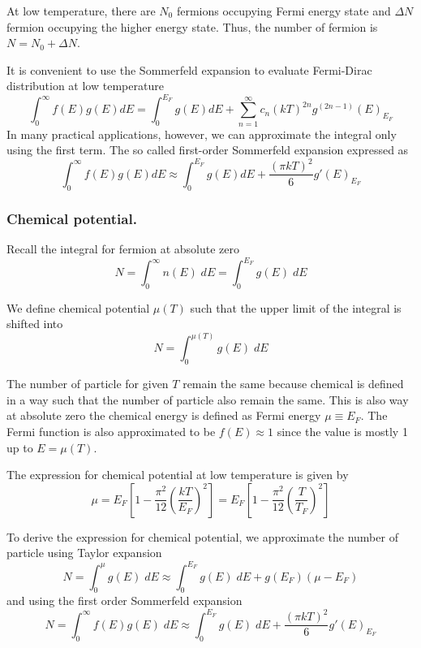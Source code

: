 \documentclass[../../../Main.tex]{subfiles}
\begin{document}
At low temperature, there are $N_0$ fermions occupying Fermi energy state and $\Delta N$ fermion occupying the higher energy state. Thus, the number of fermion is $N=N_0+\Delta N$.

It is convenient to use the Sommerfeld expansion to evaluate Fermi-Dirac distribution at low temperature
\begin{equation*}
    \int_{0}^{\infty} f(E) g(E) dE = \int_{0}^{E_F} g(E) dE + \sum_{n=1}^{\infty} c_n  (kT)^{2n}g^{(2n-1)}(E)_{E_F}
\end{equation*}
In many practical applications, however, we can approximate the integral only using the first term. The so called first-order Sommerfeld expansion expressed as 
\begin{equation*}
    \int_{0}^{\infty} f(E) g(E) dE \approx \int_{0}^{E_F} g(E) dE +  \frac{(\pi kT)^2}{6}g'(E)_{E_F}
\end{equation*}

\subsubsection{Chemical potential.} Recall the integral for fermion at absolute zero 
\begin{equation*}
    N=\int_{0}^{\infty}n(E)\;dE=\int_{0}^{E_F}g(E)\;dE
\end{equation*}

We define chemical potential $\mu(T)$ such that the upper limit of the integral is shifted into 
\begin{equation*}
    N=\int_{0}^{\mu(T)}g(E)\;dE
\end{equation*}

The number of particle for given $T$ remain the same because chemical is defined in a way such that the number of particle also remain the same. This is also way at absolute zero the chemical energy is defined as Fermi energy $\mu\equiv E_F$. The Fermi function is also approximated to be $f(E)\approx1$ since the value is mostly 1 up to $E=\mu(T)$.

The expression for chemical potential at low temperature is given by 
\begin{equation*}
    \mu=E_F\left[1-\frac{\pi^2}{12}\left(\frac{kT}{E_F}\right)^2\right]
    =E_F\left[1-\frac{\pi^2}{12}\left(\frac{T}{T_F}\right)^2\right]
\end{equation*}

To derive the expression for chemical potential, we approximate the number of particle using Taylor expansion
\begin{equation*}
    N=\int_{0}^{\mu}g(E)\;dE\approx\int_{0}^{E_F}g(E)\;dE+g(E_F)(\mu-E_F)
\end{equation*}
and using the first order Sommerfeld expansion
\begin{equation*}
    N=\int_{0}^{\infty}f(E)g(E)\;dE\approx\int_{0}^{E_F}g(E)\;dE+ \frac{(\pi kT)^2}{6}g'(E)_{E_F}
\end{equation*}
\end{document}
